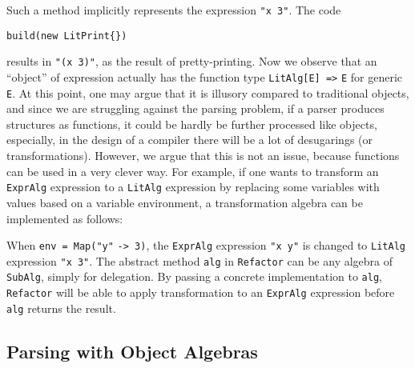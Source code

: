 Such a method implicitly represents the expression \lstinline{"x 3"}. The code

\begin{lstlisting}
build(new LitPrint{})
\end{lstlisting}

results in \lstinline{"(x 3)"}, as the result of pretty-printing. Now we observe that an ``object'' of expression actually
has the function type \lstinline{LitAlg[E] =>} \lstinline{E} for generic \lstinline{E}. At this point, one may argue
that it is illusory compared to traditional objects, and since we are struggling against the parsing problem, if a parser
produces structures as functions, it could be hardly be further processed like objects, especially, in the design of a compiler
there will be a lot of desugarings (or transformations). However, we argue that this is not an issue, because functions can be used
in a very clever way. For example, if one wants to transform an \lstinline{ExprAlg} expression to a \lstinline{LitAlg} expression by
replacing some variables with values based on a variable environment, a transformation algebra can be implemented as follows:


When \lstinline{env = Map("y"} \lstinline{-> 3)}, the \lstinline{ExprAlg} expression \lstinline{"x y"} is changed to \lstinline{LitAlg} expression \lstinline{"x 3"}. The abstract method
\lstinline{alg} in \lstinline{Refactor} can be any algebra of \lstinline{SubAlg}, simply for delegation. By passing a concrete implementation
to \lstinline{alg}, \lstinline{Refactor} will be able to apply transformation to an \lstinline{ExprAlg} expression before \lstinline{alg} returns the result.

\subsection{Parsing with Object Algebras}\label{subsec:parsingwithoa}

